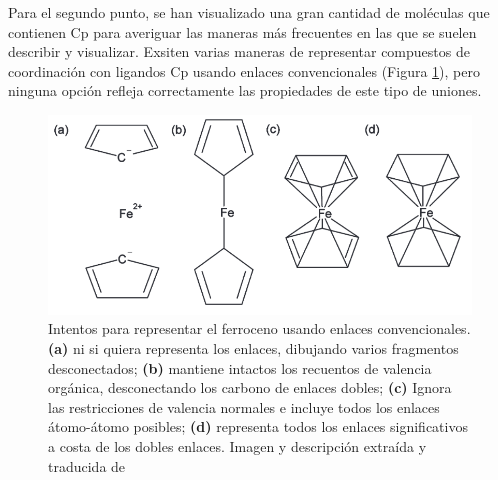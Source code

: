 Para el segundo punto, se han visualizado una gran cantidad de moléculas que contienen Cp para averiguar las maneras más frecuentes en las que se suelen describir y visualizar. Exsiten varias maneras de representar compuestos de coordinación con ligandos Cp usando enlaces convencionales (Figura \ref{fig:ferrocene_options}), pero ninguna opción refleja correctamente las propiedades de este tipo de uniones.
\begin{figure}[h!]
    \centering
    \includegraphics[scale=0.5]{imagenes/diseno/dibujo/varios_intentos_ferroceno.png}
    \caption{Intentos para representar el ferroceno usando enlaces convencionales. \textbf{(a)} ni si quiera representa los enlaces, dibujando varios fragmentos desconectados; \textbf{(b)} mantiene intactos los recuentos de valencia orgánica, desconectando los carbono de enlaces dobles; \textbf{(c)} Ignora las restricciones de valencia normales e incluye todos los enlaces átomo-átomo posibles; \textbf{(d)} representa todos los enlaces significativos a costa de los dobles enlaces. Imagen y descripción extraída y traducida de \cite{zero_order}}
    \label{fig:ferrocene_options}
\end{figure}

